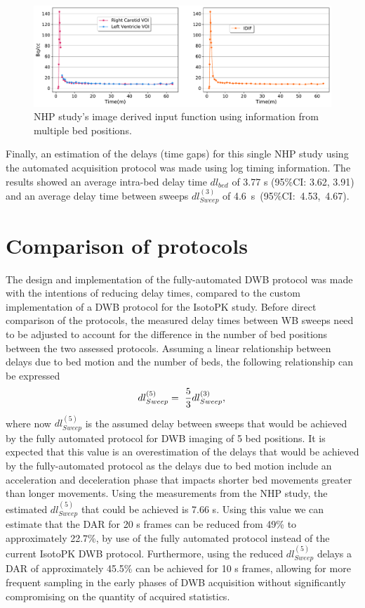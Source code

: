 %
%
\begin{figure} [ht!]
\centering
\includegraphics[scale=0.45,angle=0]{3_Results/3_1_DWB_Optimization/figures/3_1_NHP_InputFunction.pdf}
\caption{NHP study's image derived input function using information from multiple bed positions.}
\label{fig3_1:Macaque_PET_input_function}
\end{figure}
%
Finally, an estimation of the delays (time gaps) for this single NHP study using the automated acquisition protocol was made using log timing information. The results showed an average intra-bed delay time $dl_{bed}$ of 3.77 s (95\%CI: 3.62, 3.91) and an average delay time between sweeps $dl_{Sweep}^{(3)}$ of \mbox{4.6 s (95\%CI: 4.53, 4.67).} 

\section{Comparison of protocols}
The design and implementation of the fully-automated DWB protocol was made with the intentions of reducing delay times, compared to the custom implementation of a DWB protocol for the IsotoPK study. 
Before direct comparison of the protocols, the measured delay times between WB sweeps need to be adjusted to account for the difference in the number of bed positions between the two assessed protocols. 
Assuming a linear relationship between delays due to bed motion and the number of beds, the following relationship can be expressed
%
\begin{equation} \label{eqn:acq_to_dead_time_ratio}
dl_{{Sweep}}^{(5)} =\ \frac{5}{3} dl_{{Sweep}}^{(3)}  \\ , \\ 
\end{equation}
%
where now $dl_{Sweep}^{(5)}$ is the assumed delay between sweeps that would be achieved by the fully automated protocol for DWB imaging of 5 bed positions.
It is expected that this value is an overestimation of the delays that would be achieved by the fully-automated protocol as the delays due to bed motion include an acceleration and deceleration phase that impacts shorter bed movements greater than longer movements.
Using the measurements from the NHP study, the estimated $dl_{Sweep}^{(5)}$ that could be achieved is 7.66 s. 
Using this value we can estimate that the DAR for 20 s frames can be reduced from 49\% to approximately 22.7\%, by use of the fully automated protocol instead of the current IsotoPK DWB protocol. Furthermore, using the reduced $dl_{Sweep}^{(5)}$ delays a DAR of approximately 45.5\% can be achieved for 10 s frames, allowing for more frequent sampling in the early phases of DWB acquisition without significantly compromising on the quantity of acquired statistics. 

